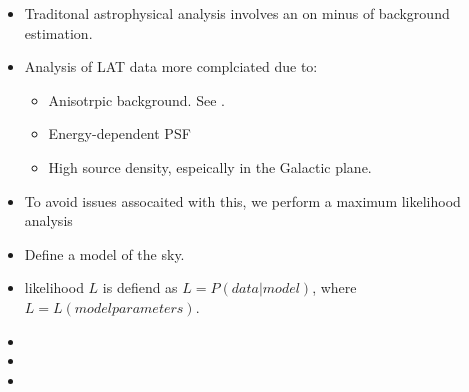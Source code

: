 
\begin{itemize}
  \item Traditonal astrophysical analysis involves an on minus of background estimation.
  \item Analysis of LAT data more complciated due to:
    \begin{itemize}
      \item Anisotrpic background. See .
      \item Energy-dependent PSF
      \item High source density, espeically in the Galactic plane.
    \end{itemize}
  \item To avoid issues assocaited with this, we perform a maximum likelihood analysis
  \item Define a model of the sky.
  \item likelihood $L$ is defiend as $L=P(data|model)$, where $L=L(model parameters)$.
  \item {}
  \item {}
  \item {}
\end{itemize}
